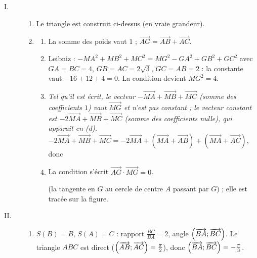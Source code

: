 \begin{description}
	\item[I. ]
	\begin{enumerate}
		\item Le triangle est construit ci-dessus (en vraie grandeur).
		\item
		\begin{enumerate}
			\item {}
				La somme des poids vaut $1$ ; $\overrightarrow{AG} = \overrightarrow{AB} + \overrightarrow{AC}$.
				\par\noindent{}
			\item {}
				Leibniz : $-MA^2 + MB^2 + MC^2 = MG^2 - GA^2 + GB^2 + GC^2$ avec $GA = BC = 4$, $GB = AC = 2\sqrt{3}$, $GC = AB = 2$ :
				la constante vaut $-16 + 12 + 4 = 0$. La condition devient $MG^2 = 4$.
				\par\noindent{}
			\item {}
				\textit{Tel qu'il est écrit, le vecteur $-\overrightarrow{MA} + \overrightarrow{MB} + \overrightarrow{MC}$ (somme des coefficients $1$) vaut $\overrightarrow{MG}$ et n'est pas constant ;
				le vecteur constant est $-2\overrightarrow{MA} + \overrightarrow{MB} + \overrightarrow{MC}$ (somme des coefficients nulle), qui apparaît en (d).}
				$-2\overrightarrow{MA} + \overrightarrow{MB} + \overrightarrow{MC} = -2\overrightarrow{MA} + \left(\overrightarrow{MA} + \overrightarrow{AB}\right) + \left(\overrightarrow{MA} + \overrightarrow{AC}\right)$, donc
				\par\noindent{}
			\item {}
				La condition s'écrit $\overrightarrow{AG} \cdot \overrightarrow{MG} = 0$.
				\par\noindent{}
				(la tangente en $G$ au cercle de centre $A$ passant par $G$) ; elle est tracée sur la figure.
		\end{enumerate}
	\end{enumerate}
	\item[II. ]
	\begin{enumerate}
		\item {}
			$S(B) = B$, $S(A) = C$ : rapport $\frac{BC}{BA} = 2$, angle $\left( \overrightarrow{BA} ; \overrightarrow{BC} \right)$. Le triangle $ABC$ est direct ($\left( \overrightarrow{AB} ; \overrightarrow{AC} \right) = \frac{\pi}{2}$), donc $\left( \overrightarrow{BA} ; \overrightarrow{BC} \right) = -\frac{\pi}{3}$.

\end{enumerate}
\end{description}
